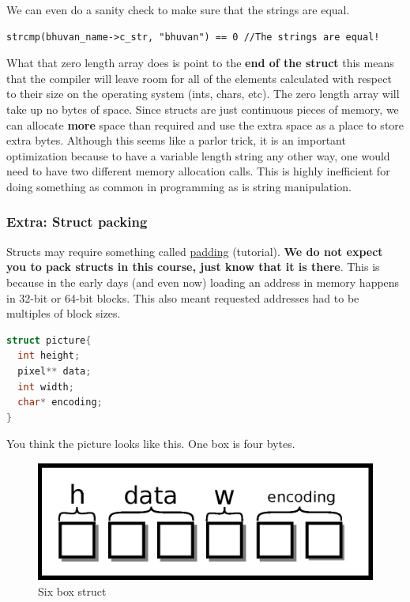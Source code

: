 We can even do a sanity check to make sure that the strings are equal.

\begin{verbatim}
strcmp(bhuvan_name->c_str, "bhuvan") == 0 //The strings are equal!
\end{verbatim}

What that zero length array does is point to the \textbf{end of the struct} this means that the compiler will leave room for all of the elements calculated with respect to their size on the operating system (ints, chars, etc).
The zero length array will take up no bytes of space.
Since structs are just continuous pieces of memory, we can allocate \textbf{more} space than required and use the extra space as a place to store extra bytes.
Although this seems like a parlor trick, it is an important optimization because to have a variable length string any other way, one would need to have two different memory allocation calls.
This is highly inefficient for doing something as common in programming as is string manipulation.

\subsubsection{Extra: Struct packing}

Structs may require something called \href{http://www.catb.org/esr/structure-packing/}{padding} (tutorial).
\textbf{We do not expect you to pack structs in this course, just know that it is there}.
This is because in the early days (and even now) loading an address in memory happens in 32-bit or 64-bit blocks.
This also meant requested addresses had to be multiples of block sizes.

\begin{lstlisting}[language=C]
struct picture{
  int height;
  pixel** data;
  int width;
  char* encoding;
}
\end{lstlisting}

You think the picture looks like this.
One box is four bytes.

\begin{figure}[H]
\centering
\includegraphics[width=.7\textwidth]{introc/drawings/struct_clean.eps}
\caption{Six box struct}
\label{fig:clean_struct}
\end{figure}

